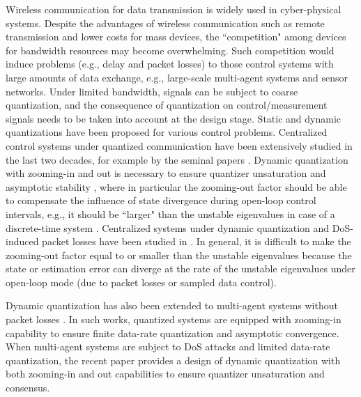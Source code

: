 \documentclass[letterpaper,journal,final,twocolumn]{IEEEtran}
\begin{document}

Wireless communication for data transmission is widely used in cyber-physical systems. Despite the advantages of wireless communication such as remote transmission and lower costs for mass devices, the ``competition" among devices for bandwidth resources may become overwhelming. Such competition would induce problems (e.g., delay and packet losses) to those control systems with large amounts of data exchange, e.g., large-scale multi-agent systems and sensor networks. 
Under limited bandwidth, signals can be subject to coarse quantization, and the consequence of quantization on control/measurement signals needs to be taken into account at the design stage. 
Static and dynamic quantizations have been proposed for various control problems. Centralized control systems under quantized communication have been extensively studied in the last two decades, for example by the seminal papers \cite{1310461, nair2004stabilizability}. Dynamic quantization with zooming-in and out is necessary to ensure quantizer unsaturation and asymptotic stability \cite{liberzon2007input}, where in particular the zooming-out factor should be able to compensate the influence of state divergence during open-loop control intervals, e.g., it should be ``larger" than the unstable eigenvalues in case of a discrete-time system \cite{you2010minimum}. Centralized systems under dynamic quantization and DoS-induced packet losses have been studied in \cite{feng2020tac, liu2021resilient}. In general, it is difficult to make the zooming-out factor equal to or smaller than the unstable eigenvalues because the state or estimation error can diverge at the rate of the unstable eigenvalues under open-loop mode (due to packet losses or sampled data control). 

Dynamic quantization has also been extended to multi-agent systems without packet losses \cite{you2011network, li2010distributed, 9429920, qiu2015quantized}. In such works, quantized systems are equipped with zooming-in capability to ensure finite data-rate quantization and asymptotic convergence. When multi-agent systems are subject to DoS attacks and limited data-rate quantization, the recent paper \cite{feng2020arxiv} provides a design of dynamic quantization with both zooming-in and out capabilities to ensure quantizer unsaturation and consensus. 
\end{document}
